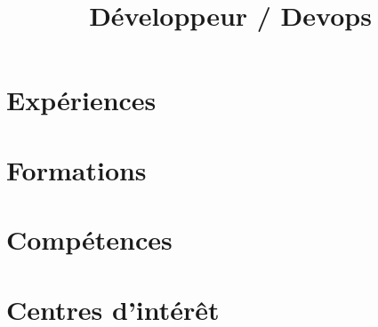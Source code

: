 \documentclass[12pt,a4paper]{moderncv}
\title{Développeur / Devops}
\begin{document}
\maketitle
\vspace*{-2.5\baselineskip}
\section{Expériences}
\section{Formations}
\section{Compétences}
\section{Centres d'intérêt}
\end{document}
